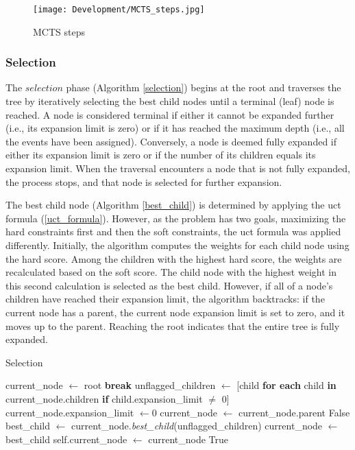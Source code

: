 \begin{figure}[H]
      \centering
      \texttt{[image: Development/MCTS\_steps.jpg]}
      \caption[MCTS steps]
      {MCTS steps}
      \label{fig:mcts_steps}
\end{figure}

\subsubsection{Selection}

The \(selection\) phase (Algorithm \ref{selection}) begins at the root and traverses the tree by iteratively selecting the best child nodes until a terminal (leaf) node is reached. A node is considered terminal if either it cannot be expanded further (i.e., its expansion limit is zero) or if it has reached the maximum depth (i.e., all the events have been assigned). Conversely, a node is deemed fully expanded if either its expansion limit is zero or if the number of its children equals its expansion limit. When the traversal encounters a node that is not fully expanded, the process stops, and that node is selected for further expansion.

The best child node (Algorithm \ref{best_child}) is determined by applying the \ac{uct} formula (\ref{uct_formula}). However, as the problem has two goals, maximizing the hard constraints first and then the soft constraints, the \ac{uct} formula was applied differently. Initially, the algorithm computes the weights for each child node using the hard score. Among the children with the highest hard score, the weights are recalculated based on the soft score. The child node with the highest weight in this second calculation is selected as the best child. However, if all of a node's children have reached their expansion limit, the algorithm backtracks: if the current node has a parent, the current node expansion limit is set to zero, and it moves up to the parent. Reaching the root indicates that the entire tree is fully expanded.

\begin{algorithm}
\caption{Selection}\label{selection}
\begin{algorithmic}[1]
    \State current\_node $\gets$ root
            \State \textbf{break}
        \EndIf
        \State unflagged\_children $\gets$ [child \textbf{for each} child \textbf{in} current\_node.children \textbf{if} child.expansion\_limit $\neq$ 0]
                \State current\_node.expansion\_limit $\gets 0$
                \State current\_node $\gets$ current\_node.parent
            \Else
                \State \Return False
            \EndIf
        \Else
            \State best\_child $\gets$ current\_node.\textit{best\_child}(unflagged\_children)
            \State current\_node $\gets$ best\_child
        \EndIf
    \EndWhile
    \State self.current\_node $\gets$ current\_node
    \State \Return True
\EndProcedure
\end{algorithmic}
\end{algorithm}

